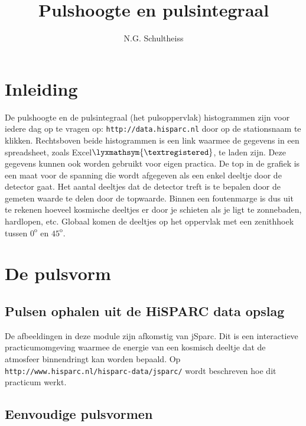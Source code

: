 



\title{Pulshoogte en pulsintegraal}


\author{N.G. Schultheiss}

\maketitle

\section{Inleiding}

De pulshoogte en de pulsintegraal (het pulsoppervlak) histogrammen
zijn voor iedere dag op te vragen op: \texttt{\small{http://data.hisparc.nl}}
door op de stationsnaam te klikken. Rechtsboven beide histogrammen
is een link waarmee de gegevens in een spreadsheet, zoals Excel${\lyxmathsym{\textregistered}}$,
te laden zijn. Deze gegevens kunnen ook worden gebruikt voor eigen
practica. De top in de grafiek is een maat voor de spanning die wordt
afgegeven als een enkel deeltje door de detector gaat. Het aantal
deeltjes dat de detector treft is te bepalen door de gemeten waarde
te delen door de topwaarde. Binnen een foutenmarge is dus uit te rekenen
hoeveel kosmische deeltjes er door je schieten als je ligt te zonnebaden,
hardlopen, etc. Globaal komen de deeltjes op het oppervlak met een
zenithhoek tussen $0^{\mathrm{o}}$ en $45^{\mathrm{o}}$.


\section{De pulsvorm}


\subsection{Pulsen ophalen uit de HiSPARC data opslag}

De afbeeldingen in deze module zijn afkomstig van jSparc. Dit is een
interactieve practicumomgeving waarmee de energie van een kosmisch
deeltje dat de atmosfeer binnendringt kan worden bepaald. Op \texttt{\small{http://www.hisparc.nl/hisparc-data/jsparc/}}
wordt beschreven hoe dit practicum werkt.


\subsection{Eenvoudige pulsvormen}

